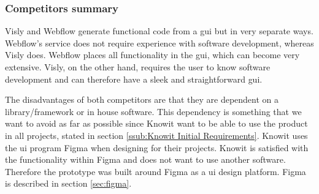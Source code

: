 


\subsubsection{Competitors summary}%
\label{ssub:Comparison}
Visly and Webflow generate functional code from a \acrfull{gui} but in very separate ways. Webflow's service does not require experience with software development, whereas Visly does. Webflow places all functionality in the \acrshort{gui}, which can become very extensive. Visly, on the other hand, requires the user to know software development and can therefore have a sleek and straightforward \acrshort{gui}.

The disadvantages of both competitors are that they are dependent on a library/framework or in house software. This dependency is something that we want to avoid as far as possible since Knowit want to be able to use the product in all projects, stated in section \ref{ssub:Knowit Initial Requirements}. Knowit uses the \acrshort{ui} program Figma when designing  for their projects. Knowit is satisfied with the functionality within Figma and does not want to use another software. Therefore the prototype was built around Figma as a \acrshort{ui} design platform. Figma is described in section \ref{sec:figma}.



